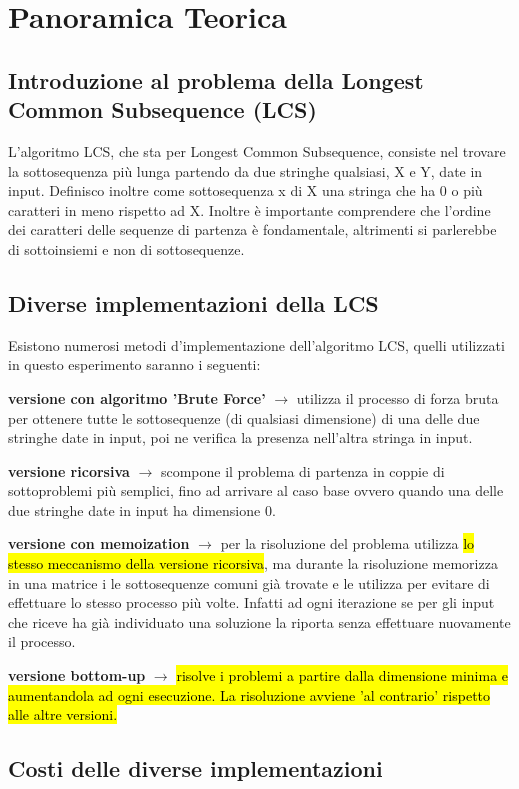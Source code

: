 \section{Panoramica Teorica}

	\subsection{Introduzione al problema della Longest Common Subsequence (LCS)}
	L'algoritmo LCS, che sta per Longest Common Subsequence, consiste nel trovare la sottosequenza più lunga partendo da due stringhe qualsiasi, X e Y, date in input. Definisco inoltre come sottosequenza x di X una stringa che ha 0 o più caratteri in meno rispetto ad X. Inoltre è importante comprendere che l'ordine dei caratteri delle sequenze di partenza è fondamentale, altrimenti si parlerebbe di sottoinsiemi e non di sottosequenze. 
	
	\subsection{Diverse implementazioni della LCS}
	Esistono numerosi metodi d'implementazione dell'algoritmo LCS, quelli utilizzati in questo esperimento saranno i seguenti:
	\begin{DESC}{1}
		\item[\textbf{versione con algoritmo 'Brute Force'}] $\rightarrow$ utilizza il processo di forza bruta per ottenere tutte le sottosequenze (di qualsiasi dimensione) di una delle due stringhe date in input, poi ne verifica la presenza nell'altra stringa in input.
		\item[\textbf{versione ricorsiva}] $\rightarrow$ scompone il problema di partenza in coppie di sottoproblemi più semplici, fino ad arrivare al caso base ovvero quando una delle due stringhe date in input ha dimensione 0.
		\item[\textbf{versione con memoization}] $\rightarrow$ per la risoluzione del problema utilizza \hl{lo stesso meccanismo della versione ricorsiva}, ma durante la risoluzione memorizza in una matrice i le sottosequenze comuni già trovate e le utilizza per evitare di effettuare lo stesso processo più volte. Infatti ad ogni iterazione se per gli input che riceve ha già individuato una soluzione la riporta senza effettuare nuovamente il processo.
		\item[\textbf{versione bottom-up}] $\rightarrow$ \hl{risolve i problemi a partire dalla dimensione minima e aumentandola ad ogni esecuzione. La risoluzione avviene 'al contrario' rispetto alle altre versioni.}
		
	\end{DESC}
	\subsection{Costi delle diverse implementazioni}